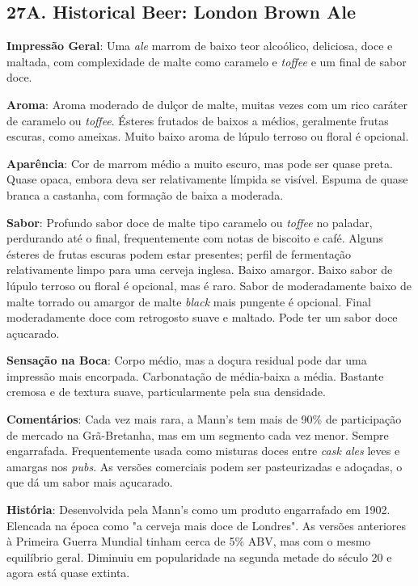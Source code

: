 \subsection*{27A. Historical Beer: London Brown Ale}
\textbf{Impressão Geral}: Uma \textit{ale} marrom de baixo teor alcoólico, deliciosa, doce e maltada, com complexidade de malte como caramelo e \textit{toffee} e um final de sabor doce.

\textbf{Aroma}: Aroma moderado de dulçor de malte, muitas vezes com um rico caráter de caramelo ou \textit{toffee}. Ésteres frutados de baixos a médios, geralmente frutas escuras, como ameixas. Muito baixo aroma de lúpulo terroso ou floral é opcional.

\textbf{Aparência}: Cor de marrom médio a muito escuro, mas pode ser quase preta. Quase opaca, embora deva ser relativamente límpida se visível. Espuma de quase branca a castanha, com formação de baixa a moderada.

\textbf{Sabor}: Profundo sabor doce de malte tipo caramelo ou \textit{toffee} no paladar, perdurando até o final, frequentemente com notas de biscoito e café. Alguns ésteres de frutas escuras podem estar presentes; perfil de fermentação relativamente limpo para uma cerveja inglesa. Baixo amargor. Baixo sabor de lúpulo terroso ou floral é opcional, mas é raro. Sabor de moderadamente baixo de malte torrado ou amargor de malte \textit{black} mais pungente é opcional. Final moderadamente doce com retrogosto suave e maltado. Pode ter um sabor doce açucarado.

\textbf{Sensação na Boca}: Corpo médio, mas a doçura residual pode dar uma impressão mais encorpada. Carbonatação de média-baixa a média. Bastante cremosa e de textura suave, particularmente pela sua densidade.

\textbf{Comentários}: Cada vez mais rara, a Mann's tem mais de 90\% de participação de mercado na Grã-Bretanha, mas em um segmento cada vez menor. Sempre engarrafada. Frequentemente usada como misturas doces entre \textit{cask ales} leves e amargas nos \textit{pubs}. As versões comerciais podem ser pasteurizadas e adoçadas, o que dá um sabor mais açucarado.

\textbf{História}: Desenvolvida pela Mann's como um produto engarrafado em 1902. Elencada na época como "a cerveja mais doce de Londres". As versões anteriores à Primeira Guerra Mundial tinham cerca de 5\% ABV, mas com o mesmo equilíbrio geral. Diminuiu em popularidade na segunda metade do século 20 e agora está quase extinta.

